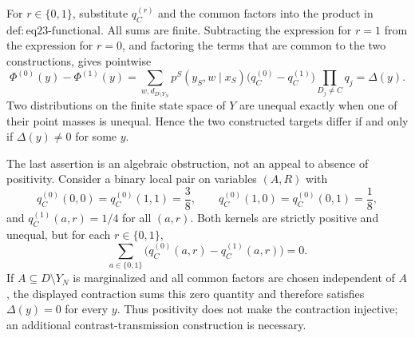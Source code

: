 For \(r\in\{0,1\}\), substitute \(q_C^{(r)}\) and the common factors into the product in \(\mathrm{def:eq23\text{-}functional}\). All sums are finite. Subtracting the expression for \(r=1\) from the expression for \(r=0\), and factoring the terms that are common to the two constructions, gives pointwise
\[
 \Phi^{(0)}(y)-\Phi^{(1)}(y)
 =\sum_{w,d_{D\setminus Y_N}}
 p^S(y_S,w\mid x_S)
 \bigl(q_C^{(0)}-q_C^{(1)}\bigr)
 \prod_{D_j\ne C}q_j
 =\Delta(y).
\]
Two distributions on the finite state space of \(Y\) are unequal exactly when one of their point masses is unequal. Hence the two constructed targets differ if and only if \(\Delta(y)\ne0\) for some \(y\).

The last assertion is an algebraic obstruction, not an appeal to absence of positivity. Consider a binary local pair on variables \((A,R)\) with
\[
 q_C^{(0)}(0,0)=q_C^{(0)}(1,1)=\frac38,
 \qquad
 q_C^{(0)}(1,0)=q_C^{(0)}(0,1)=\frac18,
\]
and \(q_C^{(1)}(a,r)=1/4\) for all \((a,r)\). Both kernels are strictly positive and unequal, but for each \(r\in\{0,1\}\),
\[
 \sum_{a\in\{0,1\}}
 \bigl(q_C^{(0)}(a,r)-q_C^{(1)}(a,r)\bigr)=0.
\]
If \(A\subseteq D\setminus Y_N\) is marginalized and all common factors are chosen independent of \(A\), the displayed contraction sums this zero quantity and therefore satisfies \(\Delta(y)=0\) for every \(y\). Thus positivity does not make the contraction injective; an additional contrast-transmission construction is necessary.